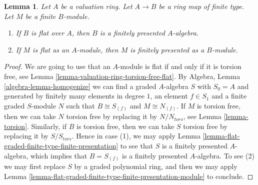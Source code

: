 \documentclass[10pt,a4paper]{amsart}
\theoremstyle{plain}
\newtheorem{lemma}[subsection]{Lemma}
\theoremstyle{definition}
\theoremstyle{remark}
\numberwithin{equation}{subsection}
\newenvironment{reference}{\comment}{\endcomment}
\begin{document}
\begin{lemma}
\label{lemma-flat-finite-type-valuation-ring-finite-presentation}
\begin{reference}
\cite[Theorem 3]{Nagata-Finitely}
\end{reference}
Let $A$ be a valuation ring. Let $A \to B$ be a ring map of finite type.
Let $M$ be a finite $B$-module.
\begin{enumerate}
\item If $B$ is flat over $A$, then $B$ is a finitely presented $A$-algebra.
\item If $M$ is flat as an $A$-module, then $M$ is finitely presented
as a $B$-module.
\end{enumerate}
\end{lemma}

\begin{proof}
We are going to use that an $A$-module is flat if and only if it is
torsion free, see
Lemma \ref{lemma-valuation-ring-torsion-free-flat}.
By
Algebra, Lemma \ref{algebra-lemma-homogenize}
we can find a graded $A$-algebra $S$ with $S_0 = A$ and generated
by finitely many elements in degree $1$, an element $f \in S_1$ and a
finite graded $S$-module $N$ such that $B \cong S_{(f)}$ and
$M \cong N_{(f)}$. If $M$ is torsion free, then we can take $N$ torsion
free by replacing it by $N/N_{tors}$, see
Lemma \ref{lemma-torsion}.
Similarly, if $B$ is torsion free, then we can take
$S$ torsion free by replacing it by $S/S_{tors}$.
Hence in case (1), we may apply
Lemma \ref{lemma-flat-graded-finite-type-finite-presentation}
to see that $S$ is a finitely presented
$A$-algebra, which implies that $B = S_{(f)}$ is a finitely
presented $A$-algebra. To see (2) we may first replace $S$ by
a graded polynomial ring, and then we may apply
Lemma \ref{lemma-flat-graded-finite-type-finite-presentation-module}
to conclude.
\end{proof}
\end{document}
